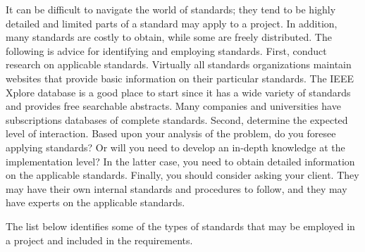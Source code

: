 It can be difficult to navigate the world of standards; they tend to be
highly detailed and limited parts of a standard may apply to a project.
In addition, many standards are costly to obtain, while some are freely
distributed. The following is advice for identifying and employing
standards. First, conduct research on applicable standards. Virtually
all standards organizations maintain websites that provide basic
information on their particular standards. The IEEE Xplore database is a
good place to start since it has a wide variety of standards and
provides free searchable abstracts. Many companies and universities have
subscriptions databases of complete standards. Second, determine the
expected level of interaction. Based upon your analysis of the problem,
do you foresee applying standards? Or will you need to develop an
in-depth knowledge at the implementation level? In the latter case, you
need to obtain detailed information on the applicable standards.
Finally, you should consider asking your client. They may have their own
internal standards and procedures to follow, and they may have experts
on the applicable standards.

The list below identifies some of the types of standards that may be
employed in a project and included in the requirements.

